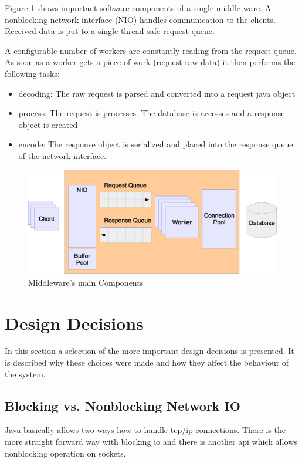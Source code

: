 \documentclass[a4paper]{article}
\begin{document}
Figure \ref{fig:middleware-threading} shows important software components of a single middle ware. A nonblocking network interface (NIO) handles communication to the clients. Received data is put to a single thread safe request queue.

A configurable number of workers are constantly reading from the request queue. As soon as a worker gets a piece of work (request raw data) it then performs the following tasks:
\begin{itemize}
\item decoding: The raw request is parsed and converted into a request java object
\item process: The request is processes. The database is accesses and a response object is created
\item encode: The response object is serialized and placed into the response queue of the network interface.
\end{itemize}


\begin{figure}
	\begin{center}
    \includegraphics[scale=0.4]{../drawings/broker-threading.eps}
  \end{center}
  \caption{Middleware's main Components}
  \label{fig:middleware-threading}
\end{figure}

\section{Design Decisions}
In this section a selection of the more important design decisions is presented. It is described why these choices were made and how they affect the behaviour of the system.

\subsection{Blocking vs. Nonblocking Network IO}
Java basically allows two ways how to handle tcp/ip connections. There is the more straight forward way with blocking io and there is another api which allows nonblocking operation on sockets.
\end{document}
